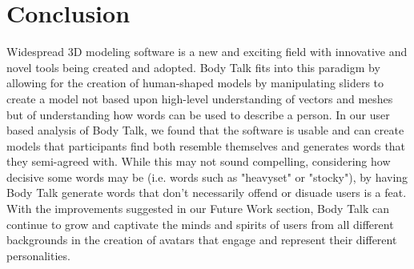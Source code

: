 \documentclass[journal]{vgtc}                %
\begin{document}
\section{Conclusion}
Widespread 3D modeling software is a new and exciting field with innovative and novel tools being created and adopted. Body Talk
fits into this paradigm by allowing for the creation of human-shaped models by manipulating sliders to create a model not
based upon high-level understanding of vectors and meshes but of understanding how words can be used to describe a person.
In our user based analysis of Body Talk, we found that the software is usable and can create models that participants find both
resemble themselves and generates words that they semi-agreed with. While this may not sound compelling, considering how
decisive some words may be (i.e. words such as "heavyset" or "stocky"), by having Body Talk generate words that don't necessarily
offend or disuade users is a feat. With the improvements suggested in our Future Work section, Body Talk can continue to grow and 
captivate the minds and spirits of users from all different backgrounds in the creation of avatars that engage and represent their
different personalities.


%

%
%
%


\end{document}
